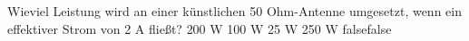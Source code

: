     {Wieviel Leistung wird an einer künstlichen 50 Ohm-Antenne umgesetzt, wenn ein effektiver Strom von 2 A fließt?}
    {200 W}
    {100 W}
    {25 W}
    {250 W}
    {false}{false}